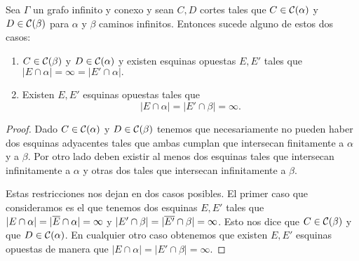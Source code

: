 \documentclass[tesis.tex]{subfiles}
\begin{document}
\begin{lema}\label{lema_esquinas_caminos}
	
	Sea $\Gamma$ un grafo infinito y conexo y sean $C,D$ cortes tales que $C \in {\cal C}(\alpha)$ y $D \in {\cal C}(\beta)$ para $\alpha$ y $\beta$ caminos infinitos.
	Entonces sucede alguno de estos dos casos:
	\begin{enumerate}
		\item $C \in {\cal C}(\beta)$ y $D \in {\cal C}(\alpha)$ y existen esquinas opuestas $E, E'$ tales que $|E \cap \alpha| = \infty = |E' \cap \alpha|.$
		
		\item Existen $E, E'$ esquinas opuestas tales que
		\[
		|E \cap \alpha| = |E' \cap \beta | = \infty. 
		\]
		
	\end{enumerate}
\end{lema}
\begin{proof}
	Dado $C \in {\cal C}(\alpha)$ y $D \in {\cal C}(\beta)$ tenemos que necesariamente no pueden haber dos esquinas adyacentes tales que ambas cumplan que intersecan finitamente a $\alpha$ y a $\beta$.
	Por otro lado deben existir al menos dos esquinas tales que intersecan infinitamente a $\alpha$ y otras dos tales que intersecan infinitamente a $\beta$. 
	
	Estas restricciones nos dejan en dos casos posibles.
	El primer caso que consideramos es el que tenemos dos esquinas $E, E'$ tales que $|E \cap \alpha| = |\overline{E} \cap \alpha| = \infty$ y $|E' \cap \beta| = |\overline{E'} \cap \beta|=\infty$.
	Esto nos dice que $C \in {\cal C}(\beta)$ y que $D \in {\cal C}(\alpha)$.
	En cualquier otro caso obtenemos que existen $E,E'$ esquinas opuestas de manera que $|E \cap \alpha| = |E' \cap \beta | = \infty$.
	
\end{proof}
\end{document}
